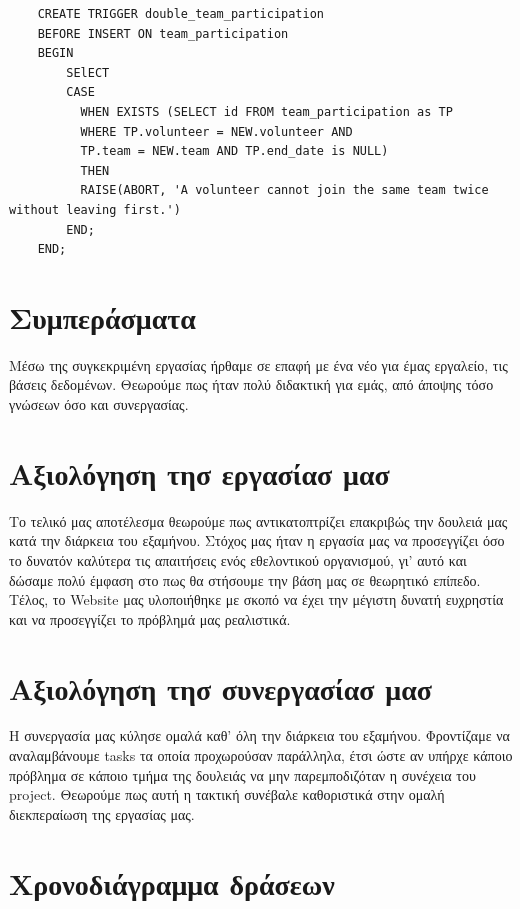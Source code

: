 \documentclass[manuscript,screen,review]{acmart}
\newcommand{\en}[1]{\foreignlanguage{english}{#1}}
\begin{document}
    \begin{lstlisting}
    CREATE TRIGGER double_team_participation 
    BEFORE INSERT ON team_participation
    BEGIN 
        SElECT 
        CASE 
          WHEN EXISTS (SELECT id FROM team_participation as TP 
          WHERE TP.volunteer = NEW.volunteer AND 
          TP.team = NEW.team AND TP.end_date is NULL) 
          THEN 
          RAISE(ABORT, 'A volunteer cannot join the same team twice without leaving first.')
        END;
    END;   
    \end{lstlisting}
    


\section{Συμπεράσματα}
Μέσω της συγκεκριμένη εργασίας ήρθαμε σε επαφή με ένα νέο για έμας εργαλείο, τις βάσεις δεδομένων. Θεωρούμε πως ήταν πολύ διδακτική για εμάς, από άποψης τόσο γνώσεων όσο και συνεργασίας.  

\section{Αξιολόγηση τησ εργασίασ μασ}
Το τελικό μας αποτέλεσμα θεωρούμε πως αντικατοπτρίζει επακριβώς την δουλειά μας κατά την διάρκεια του εξαμήνου. Στόχος μας ήταν η εργασία μας να προσεγγίζει όσο το δυνατόν καλύτερα τις απαιτήσεις ενός εθελοντικού οργανισμού, γι' αυτό και δώσαμε πολύ έμφαση στο πως θα στήσουμε την βάση μας σε θεωρητικό επίπεδο. Τέλος, το \en{Website} μας υλοποιήθηκε με σκοπό να έχει την μέγιστη δυνατή ευχρηστία και να προσεγγίζει το πρόβλημά μας ρεαλιστικά. 

\section{Αξιολόγηση τησ συνεργασίασ μασ}
Η συνεργασία μας κύλησε ομαλά καθ' όλη την διάρκεια του εξαμήνου. Φροντίζαμε να αναλαμβάνουμε \en{tasks} τα οποία προχωρούσαν παράλληλα, έτσι ώστε αν υπήρχε κάποιο πρόβλημα σε κάποιο τμήμα της δουλειάς να μην παρεμποδιζόταν η συνέχεια του \en{project}. Θεωρούμε πως αυτή η τακτική συνέβαλε καθοριστικά στην ομαλή διεκπεραίωση της εργασίας μας.

\section{Χρονοδιάγραμμα δράσεων}
\end{document}
